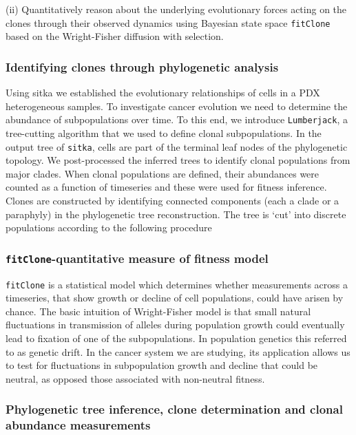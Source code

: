 (ii) Quantitatively reason about the underlying evolutionary
forces acting on the clones through their observed dynamics
 using Bayesian state space \texttt{fitClone}  based on the Wright-Fisher diffusion with selection.

\subsubsection{Identifying clones through phylogenetic analysis}
Using sitka we established the evolutionary relationships of cells in a PDX heterogeneous samples. To investigate cancer evolution we need to determine the abundance of subpopulations over time. To this end, we introduce \texttt{Lumberjack}, a tree-cutting algorithm that we used to define clonal subpopulations. In the output tree of \texttt{sitka}, cells are part of the terminal leaf nodes of the phylogenetic topology. We post-processed the inferred trees to identify clonal populations from major clades. When clonal populations are defined, their abundances were counted as a function of timeseries and these were used for fitness inference. 
Clones are constructed by identifying connected components (each a clade or a paraphyly) in the phylogenetic tree reconstruction. The tree is `cut' into discrete populations according to the following procedure


\subsubsection{\texttt{fitClone}-quantitative measure of fitness model}
 \texttt{fitClone} is a statistical model which determines whether measurements across a timeseries, that show growth or decline of cell populations, could have arisen by chance. The basic intuition of Wright-Fisher model is that small natural fluctuations in transmission of alleles during population growth could eventually lead to fixation of one of the subpopulations. In population genetics this referred to as genetic drift. In the cancer system we are studying, its application allows us to test for fluctuations in subpopulation growth and decline that could be neutral, as opposed those associated with non-neutral fitness. 

\subsubsection{Phylogenetic tree inference, clone determination and clonal abundance measurements}

